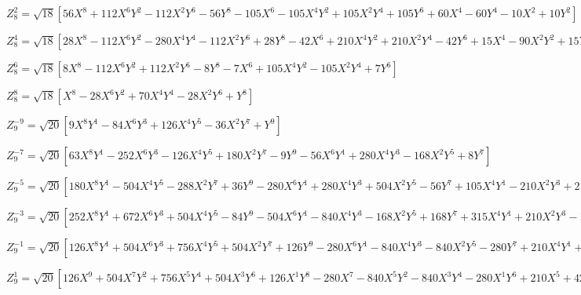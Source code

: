 \documentclass[10pt,landscape]{article}
\begin{document}
\vspace{1.2 mm}
\noindent $ Z^{2}_{8} = \sqrt{18} [56X^{8} +112X^{6}Y^{2} -112X^{2}Y^{6} -56Y^{8} -105X^{6} -105X^{4}Y^{2} +105X^{2}Y^{4} +105Y^{6} +60X^{4} -60Y^{4} -10X^{2} +10Y^{2}] $

\vspace{1.2 mm}
\noindent $ Z^{4}_{8} = \sqrt{18} [28X^{8} -112X^{6}Y^{2} -280X^{4}Y^{4} -112X^{2}Y^{6} +28Y^{8} -42X^{6} +210X^{4}Y^{2} +210X^{2}Y^{4} -42Y^{6} +15X^{4} -90X^{2}Y^{2} +15Y^{4}] $

\vspace{1.2 mm}
\noindent $ Z^{6}_{8} = \sqrt{18} [8X^{8} -112X^{6}Y^{2} +112X^{2}Y^{6} -8Y^{8} -7X^{6} +105X^{4}Y^{2} -105X^{2}Y^{4} +7Y^{6}] $

\vspace{1.2 mm}
\noindent $ Z^{8}_{8} = \sqrt{18} [X^{8} -28X^{6}Y^{2} +70X^{4}Y^{4} -28X^{2}Y^{6} +Y^{8}] $

\vspace{1.2 mm}
\noindent $ Z^{-9}_{9} = \sqrt{20} [9X^{8}Y^{1} -84X^{6}Y^{3} +126X^{4}Y^{5} -36X^{2}Y^{7} +Y^{9}] $

\vspace{1.2 mm}
\noindent $ Z^{-7}_{9} = \sqrt{20} [63X^{8}Y^{1} -252X^{6}Y^{3} -126X^{4}Y^{5} +180X^{2}Y^{7} -9Y^{9} -56X^{6}Y^{1} +280X^{4}Y^{3} -168X^{2}Y^{5} +8Y^{7}] $

\vspace{1.2 mm}
\noindent $ Z^{-5}_{9} = \sqrt{20} [180X^{8}Y^{1} -504X^{4}Y^{5} -288X^{2}Y^{7} +36Y^{9} -280X^{6}Y^{1} +280X^{4}Y^{3} +504X^{2}Y^{5} -56Y^{7} +105X^{4}Y^{1} -210X^{2}Y^{3} +21Y^{5}] $

\vspace{1.2 mm}
\noindent $ Z^{-3}_{9} = \sqrt{20} [252X^{8}Y^{1} +672X^{6}Y^{3} +504X^{4}Y^{5} -84Y^{9} -504X^{6}Y^{1} -840X^{4}Y^{3} -168X^{2}Y^{5} +168Y^{7} +315X^{4}Y^{1} +210X^{2}Y^{3} -105Y^{5} -60X^{2}Y^{1} +20Y^{3}] $

\vspace{1.2 mm}
\noindent $ Z^{-1}_{9} = \sqrt{20} [126X^{8}Y^{1} +504X^{6}Y^{3} +756X^{4}Y^{5} +504X^{2}Y^{7} +126Y^{9} -280X^{6}Y^{1} -840X^{4}Y^{3} -840X^{2}Y^{5} -280Y^{7} +210X^{4}Y^{1} +420X^{2}Y^{3} +210Y^{5} -60X^{2}Y^{1} -60Y^{3} +5Y^{1}] $

\vspace{1.2 mm}
\noindent $ Z^{1}_{9} = \sqrt{20} [126X^{9} +504X^{7}Y^{2} +756X^{5}Y^{4} +504X^{3}Y^{6} +126X^{1}Y^{8} -280X^{7} -840X^{5}Y^{2} -840X^{3}Y^{4} -280X^{1}Y^{6} +210X^{5} +420X^{3}Y^{2} +210X^{1}Y^{4} -60X^{3} -60X^{1}Y^{2} +5X^{1}] $
\end{document}
